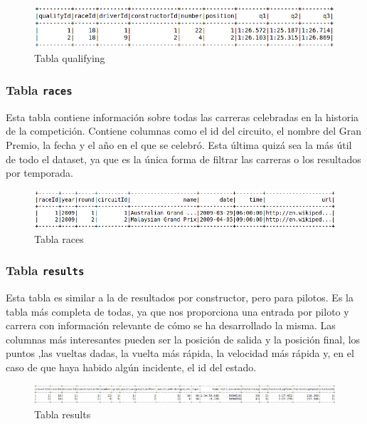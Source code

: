 \documentclass[12pt,twoside,titlepage]{report}
\begin{document}
\begin{figure}[H]
  \includegraphics[scale=0.4]{qualifying_table.png}
  \centering
  \caption{Tabla qualifying}
  \label{fig:quali}
  \centering
\end{figure}


\subsubsection{Tabla \texttt{races}}

Esta tabla contiene información sobre todas las carreras celebradas en la historia de la competición. Contiene columnas como el id del circuito, el nombre del Gran Premio, la fecha y el año en el que se celebró. Esta última quizá sea la más útil de todo el dataset, ya que es la única forma de filtrar las carreras o los resultados por temporada. 

\begin{figure}[H]
  \includegraphics[scale=0.4]{races_table.png}
  \centering
  \caption{Tabla races}
  \label{fig:races}
  \centering
\end{figure}

\subsubsection{Tabla \texttt{results}}

Esta tabla es similar a la de resultados por constructor, pero para pilotos. Es la tabla más completa de todas, ya que nos proporciona una entrada por piloto y carrera con información relevante de cómo se ha desarrollado la misma. Las columnas más interesantes pueden ser la posición de salida y la posición final, los puntos ,las vueltas dadas, la vuelta más rápida, la velocidad más rápida y, en el caso de que haya habido algún incidente, el id del estado. 

\begin{figure}[H]
  \includegraphics[scale=0.27]{results_table.png}
  \centering
  \caption{Tabla results}
  \label{fig:resultstab}
  \centering
\end{figure}
\end{document}
